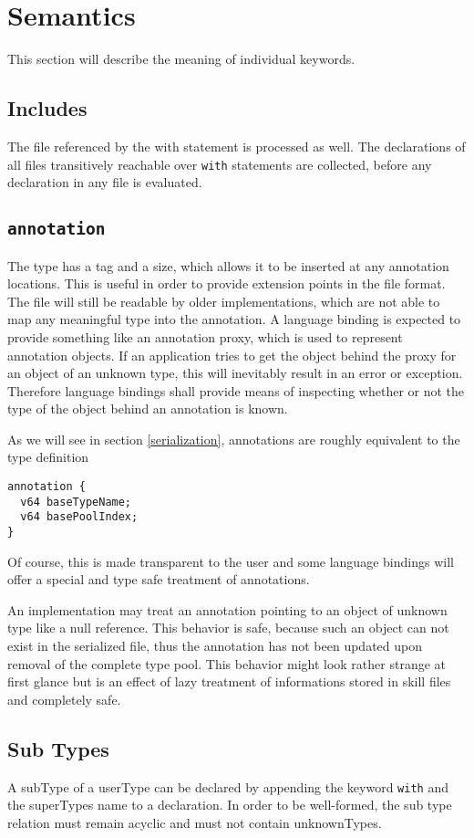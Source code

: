 
\section{Semantics}

This section will describe the meaning of individual keywords.

\subsection{Includes}
The file referenced by the with statement is processed as well. The declarations of all files transitively reachable over \texttt{with} statements are collected, before any declaration in any file is evaluated.

\subsection{\texttt{annotation}}
The type has a tag and a size, which allows it to be inserted at any annotation locations. This is useful in order to provide extension points in the file format. The file will still be readable by older implementations, which are not able to map any meaningful type into the annotation. A language binding is expected to provide something like an annotation proxy, which is used to represent annotation objects. If an application tries to get the object behind the proxy for an object of an unknown type, this will inevitably result in an error or exception. Therefore language bindings shall provide means of inspecting whether or not the type of the object behind an annotation is known.

As we will see in section \ref{serialization}, annotations are roughly equivalent to the type definition
\begin{verbatim}
annotation {
  v64 baseTypeName;
  v64 basePoolIndex;
}
\end{verbatim}
Of course, this is made transparent to the user and some language bindings will offer a special and type safe treatment of annotations.

An implementation may treat an annotation pointing to an object of unknown type like a null reference. This behavior is safe, because such an object can not exist in the serialized file, thus the annotation has not been updated upon removal of the complete type pool. This behavior might look rather strange at first glance but is an effect of lazy treatment of informations stored in skill files and completely safe.

\subsection{Sub Types}
A \gls{subType} of a \gls{userType} can be declared by appending the keyword \texttt{with} and the \gls{superType}s name to a declaration. In order to be well-formed, the sub type relation must remain acyclic and must not contain \glspl{unknownType}.

